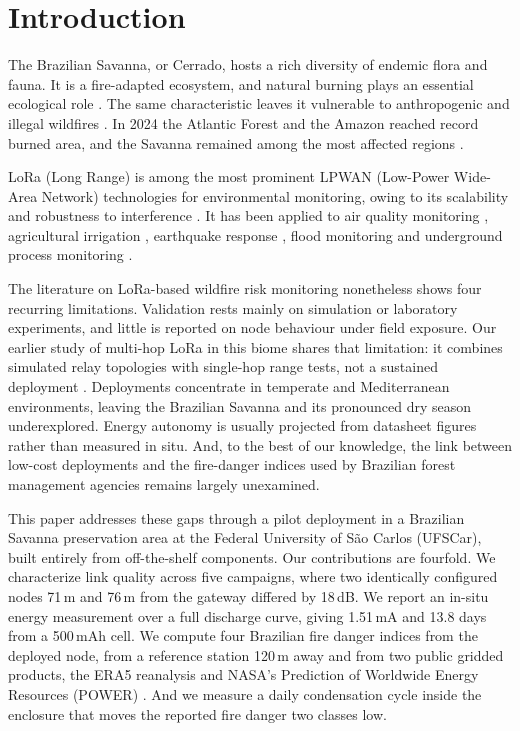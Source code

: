 \documentclass[conference]{IEEEtran}
\newenvironment{changed}{}{}
\begin{document}
\section{Introduction}
The Brazilian Savanna, or Cerrado, hosts a rich diversity of endemic flora and fauna. It is a fire-adapted ecosystem, and natural burning plays an essential ecological role \cite{coutinho_ecological_1982}. The same characteristic leaves it vulnerable to anthropogenic and illegal wildfires \cite{pivello_understanding_2021}. In 2024 the Atlantic Forest and the Amazon reached record burned area, and the Savanna remained among the most affected regions \cite{bello_carvalho_brazil_2025}.

LoRa (Long Range) is among the most prominent LPWAN (Low-Power Wide-Area Network) technologies for environmental monitoring, owing to its scalability and robustness to interference \cite{aloysaugustinStudyLoRaLong2016}. It has been applied to air quality monitoring \cite{cunha_arquitetura_2024}, agricultural irrigation \cite{caetano_low-cost_2025}, earthquake response \cite{boccadoroQuakeSenseLoRacompliantEarthquake2019}, flood monitoring \cite{mousavi_design_2021} and underground process monitoring \cite{ebiSynchronousLoRaMesh2019}.

The literature on LoRa-based wildfire risk monitoring nonetheless shows four recurring limitations. Validation rests mainly on simulation or laboratory experiments, and little is reported on node behaviour under field exposure. Our earlier study of multi-hop LoRa in this biome shares that limitation: it combines simulated relay topologies with single-hop range tests, not a sustained deployment \cite{cruz_multihop_2025}. Deployments concentrate in temperate and Mediterranean environments, leaving the Brazilian Savanna and its pronounced dry season \cite{coutinho_ecological_1982} underexplored. Energy autonomy is usually projected from datasheet figures rather than measured in situ. And, to the best of our knowledge, the link between low-cost deployments and the fire-danger indices used by Brazilian forest management agencies remains largely unexamined.

\begin{changed}
This paper addresses these gaps through a pilot deployment in a Brazilian Savanna preservation area at the Federal University of São Carlos (UFSCar), built entirely from off-the-shelf components. Our contributions are fourfold. We characterize link quality across five campaigns, where two identically configured nodes 71\,m and 76\,m from the gateway differed by 18\,dB. We report an in-situ energy measurement over a full discharge curve, giving 1.51\,mA and 13.8 days from a 500\,mAh cell. We compute four Brazilian fire danger indices from the deployed node, from a reference station 120\,m away and from two public gridded products, the ERA5 reanalysis \cite{hersbach_era5_2020} and NASA's Prediction of Worldwide Energy Resources (POWER) \cite{nasa_power}. And we measure a daily condensation cycle inside the enclosure that moves the reported fire danger two classes low.
\end{changed}
\end{document}
